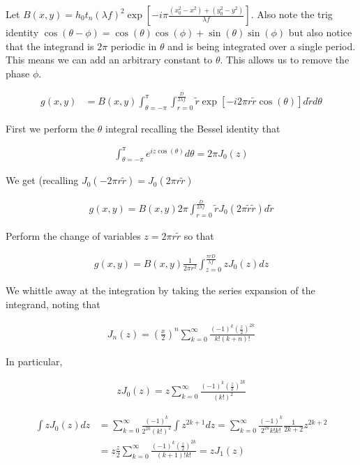 \documentclass[12pt]{article}
\begin{document}
Let $B(x,y) = h_0 t_n (\lambda f)^2 \exp\left[-i\pi\frac{(x_0^2-x^2)+(y_0^2-y^2)}{\lambda f}\right]$. Also note the trig identity $\cos(\theta-\phi) = \cos(\theta)\cos(\phi) + \sin(\theta)\sin(\phi)$ but also notice that the integrand is $2\pi$ periodic in $\theta$ and is being integrated over a single period. This means we can add an arbitrary constant to $\theta$. This allows us to remove the phase $\phi$.

\begin{align}
g(x,y) &= B(x,y) \int_{\theta = -\pi}^{ \pi} \int_{r = 0}^{\frac{D}{2\lambda f}} \tilde{r} \exp\left[-i2\pi r \tilde{r}\cos(\theta)\right] d\tilde{r} d\theta
\end{align}

First we perform the $\theta$ integral recalling the Bessel identity that

\begin{align}
\int_{\theta=-\pi}^{\pi} e^{i z \cos(\theta)} d\theta = 2\pi J_0(z)
\end{align}

We get (recalling $J_0(-2\pi r \tilde{r}) = J_0(2\pi r \tilde{r})$

\begin{align}
g(x,y) = B(x,y) 2\pi \int_{r=0}^{\frac{D}{2\lambda f}} \tilde{r} J_0(2\pi \tilde{r} \tilde{r}) d\tilde{r}
\end{align}

Perform the change of variables $z= 2\pi r \tilde{r}$ so that

\begin{align}
g(x,y) = B(x,y) \frac{1}{2\pi r^2} \int_{z=0}^{\frac{\pi r D}{\lambda f}} z J_0(z) dz
\end{align}

We whittle away at the integration by taking the series expansion of the integrand, noting that

\begin{align}
J_n(z) = \left(\frac{x}{2}\right)^n\sum_{k=0}^{\infty} \frac{(-1)^k\left(\frac{z}{2}\right)^{2k}}{k!(k+n)!}
\end{align}

In particular,

\begin{align}
zJ_0(z) = z \sum_{k=0}^{\infty} \frac{(-1)^k\left(\frac{z}{2}\right)^{2k}}{(k!)^2}
\end{align}

\begin{align}
\int zJ_0(z) dz &= \sum_{k=0}^{\infty} \frac{(-1)^k}{2^{2k} (k!)^2}\int z^{2k+1} dz = \sum_{k=0}^{\infty} \frac{(-1)^k}{2^{2k}k!k!} \frac{1}{2k+2} z^{2k+2}\\
&= z \frac{z}{2}\sum_{k=0}^{\infty} \frac{(-1)^k \left(\frac{z}{2}\right)^{2k}}{(k+1)!k!} = zJ_1(z)
\end{align}
\end{document}
